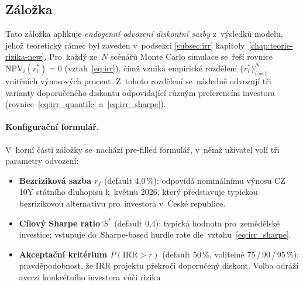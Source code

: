 \subsection{Záložka }
\label{sec:vystupy_irr}

Tato záložka aplikuje \emph{endogenní odvození diskontní sazby}
z~výsledků modelu, jehož teoretický rámec byl zaveden v~podsekci
\ref{subsec:irr} kapitoly~\ref{chap:teorie-rizika-new}. Pro~každý
ze~$N$ scénářů Monte Carlo simulace se~řeší rovnice
$\mathrm{NPV}_i(r_i^*) = 0$ (vztah~\ref{eq:irr}), čímž vzniká
empirické rozdělení $\{r_i^*\}_{i=1}^{N}$ vnitřních výnosových
procent. Z~tohoto rozdělení se~následně odvozují tři varianty
doporučeného diskontu odpovídající různým preferencím investora
(rovnice~\ref{eq:irr_quantile} a~\ref{eq:irr_sharpe}).

\paragraph{Konfigurační formulář.}
V~horní části záložky se~nachází pre-filled formulář, v~němž uživatel
volí tři parametry odvození:
\begin{itemize}
    \item \textbf{Bezriziková sazba $r_f$} (default 4{,}0\,\%):
          odpovídá nominálnímu výnosu CZ 10Y státního dluhopisu
          k~květnu 2026, který představuje typickou bezrizikovou
          alternativu pro~investora v~České republice.
    \item \textbf{Cílový Sharpe ratio $S^*$} (default 0{,}4):
          typická hodnota pro~zemědělské investice; vstupuje
          do~Sharpe-based hurdle rate dle~vztahu~\eqref{eq:irr_sharpe}.
    \item \textbf{Akceptační kritérium $P(\mathrm{IRR} > r)$}
          (default 50\,\%, volitelně 75\,/\,90\,/\,95\,\%):
          pravděpodobnost, že IRR projektu překročí doporučený diskont.
          Volba odráží averzi konkrétního investora vůči riziku
\end{itemize}


